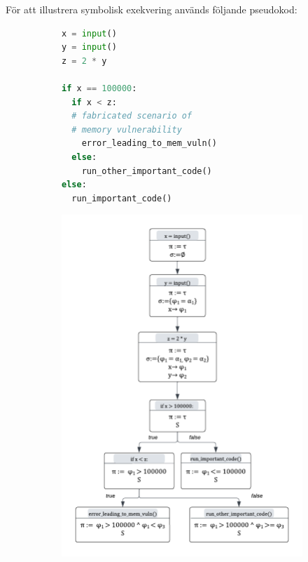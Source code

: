 För att illustrera symbolisk exekvering används följande pseudokod:

\begin{figure}[H]
    \begin{subfigure}[b]{0.58\textwidth}
        \begin{lstlisting}[language=Python, frame=single, basicstyle=\small]
x = input()
y = input()
z = 2 * y

if x == 100000:
  if x < z:
  # fabricated scenario of
  # memory vulnerability
    error_leading_to_mem_vuln()
  else:
    run_other_important_code()
else:
  run_important_code()
\end{lstlisting}
        \caption{} %
        \label{fig:symbex_example_code}
    \end{subfigure}
    \hspace*{\fill}
    \begin{subfigure}[t]{0.5\textwidth}
        \centering
        \includegraphics[scale=0.38]{figures/final_symbolic_example_graph.png}

\end{subfigure}
\end{figure}
